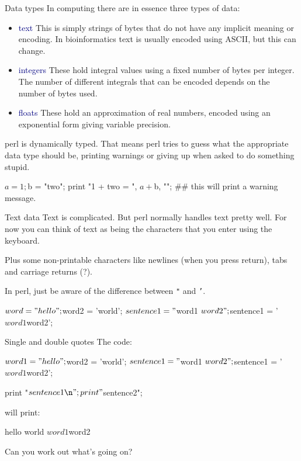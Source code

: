 \documentclass[pdf]{beamer}
\begin{document}
\begin{frame}[fragile]{Data types}
  In computing there are in essence three types of data:
  \small{
   \begin{itemize}
   \item \textcolor{navy}{text} This is simply strings of bytes that do not
     have any implicit meaning or encoding. In bioinformatics text is usually
     encoded using ASCII, but this can change.
   \item \textcolor{navy}{integers} These hold integral values using a fixed
     number of bytes per integer. The number of
     different integrals that can be encoded depends on the number of bytes
     used.
   \item \textcolor{navy}{floats} These hold an approximation of real numbers,
     encoded using an exponential form giving variable precision.
   \end{itemize}

  perl is dynamically typed. That means perl tries to guess what the
  appropriate data type should be, printing warnings or giving up when asked
  to do something stupid.
}
  \begin{perlcode}
    $a = 1;
    $b = "two";
    print "1 + two = ", $a + $b, "\n";
    ## this will print a warning message.
  \end{perlcode}

\end{frame}

\begin{frame}[fragile]{Text data}
  Text is complicated. But perl normally handles text pretty well. For now
  you can think of text as being the characters that you enter using the
  keyboard.

  Plus some non-printable characters like newlines (when you press return),
  tabs and carriage returns (?).

  In perl, just be aware of the difference between \texttt{"} and \texttt{'}.

  \begin{perlcode}
    $word = "hello";
    $word2 = 'world';
    $sentence1 = "$word1 $word2";
    $sentence1 = '$word1 $word2';
  \end{perlcode}
\end{frame}

\begin{frame}[fragile]{Single and double quotes}
  The code:
  \begin{perlcode}
  $word1 = "hello";
  $word2 = 'world';
  $sentence1 = "$word1 $word2";
  $sentence1 = '$word1 $word2';

  print "$sentence1\n";
  print "$sentence2\n";
  \end{perlcode}
  
  will print:
  \begin{consolecode}
  hello world
  $word1 $word2
  \end{consolecode}

  Can you work out what's going on?
\end{frame}
\end{document}
